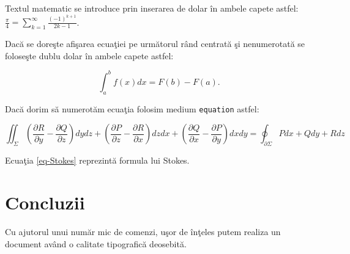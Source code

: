 \documentclass[11pt,a4paper]{article}
\begin{document}
	Textul matematic se introduce prin inserarea de dolar în ambele capete astfel:
	$\frac{\pi}{4} = \sum_{k=1}^\infty \frac{(-1)^{k+1}}{2k-1}$.

	Dacă se doreşte afişarea ecuaţiei pe următorul rând centrată şi nenumerotată se foloseşte dublu dolar în ambele capete astfel:

	$$\int_a^b f(x) dx = F(b) - F(a).$$

	Dacă dorim să numerotăm ecuaţia folosim medium \texttt{equation} astfel:

	\begin{equation} \label{eq-Stokes}
		\iint_{\Sigma} \left( \frac{\partial R}{\partial y} - \frac{\partial Q}{\partial z}\right)dy dz + \left( \frac{\partial P}{\partial z} - \frac{\partial R}{\partial x} \right) dz dx + \left( \frac{\partial Q}{\partial x} - \frac{\partial P}{\partial y} \right) dx dy = \oint_{\partial \Sigma} {P dx + Q dy + R dz}
	\end{equation}

	Ecuaţia \eqref{eq-Stokes} reprezint\u a formula lui Stokes.

	\section{Concluzii}

	Cu ajutorul unui număr mic de comenzi, uşor de înţeles putem realiza un document având o calitate tipografică deosebită.
\end{document}
